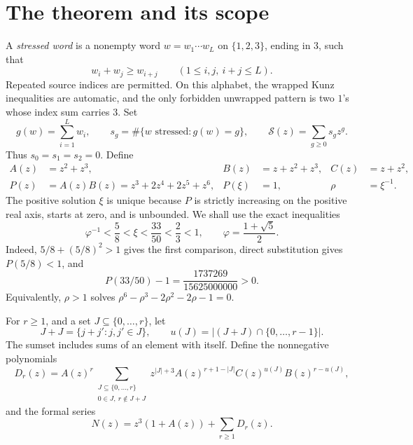 \documentclass[11pt,letterpaper]{article}
\theoremstyle{definition}
\newcommand{\cS}{\mathcal S}\newcommand{\cU}{\mathcal U}
\begin{document}
\section{The theorem and its scope}\label{ska:sec:theorem}
A \emph{stressed word} is a nonempty word $w=w_1\cdots w_L$ on $\{1,2,3\}$, ending in $3$, such that
\begin{equation}\label{ska:eq:unwrapped}
w_i+w_j\ge w_{i+j}\qquad(1\le i,j,\ i+j\le L).
\end{equation}
Repeated source indices are permitted. On this alphabet, the wrapped Kunz inequalities are automatic, and the only forbidden unwrapped pattern is two $1$'s whose index sum carries $3$. Set
\[
g(w)=\sum_{i=1}^Lw_i,\qquad
s_g=\#\{w\text{ stressed}:g(w)=g\},\qquad
\cS(z)=\sum_{g\ge0}s_gz^g.
\]
Thus $s_0=s_1=s_2=0$. Define
\begin{align}
A(z)&=z^2+z^3,& B(z)&=z+z^2+z^3,& C(z)&=z+z^2,\label{ska:eq:ABC}\\
P(z)&=A(z)B(z)=z^3+2z^4+2z^5+z^6,
&P(\xi)&=1,& \rho&=\xi^{-1}.\label{ska:eq:P}
\end{align}
The positive solution $\xi$ is unique because $P$ is strictly increasing on the positive real axis, starts at zero, and is unbounded. We shall use the exact inequalities
\begin{equation}\label{ska:eq:rootbracket}
\varphi^{-1}<\frac58<\xi<\frac{33}{50}<\frac23<1,
\qquad \varphi=\frac{1+\sqrt5}{2}.
\end{equation}
Indeed, $5/8+(5/8)^2>1$ gives the first comparison, direct substitution gives $P(5/8)<1$, and
\begin{equation}\label{ska:eq:rootcert}
P(33/50)-1=\frac{1737269}{15625000000}>0.
\end{equation}
Equivalently, $\rho>1$ solves $\rho^6-\rho^3-2\rho^2-2\rho-1=0$.

For $r\ge1$, and a set $J\subseteq\{0,\ldots,r\}$, let
\[
J+J=\{j+j':j,j'\in J\},\qquad
u(J)=|(J+J)\cap\{0,\ldots,r-1\}|.
\]
The sumset includes sums of an element with itself. Define the nonnegative polynomials
\begin{equation}\label{ska:eq:Dr}
D_r(z)=A(z)^r
\sum_{\substack{J\subseteq\{0,\ldots,r\}\\0\in J,\ r\notin J+J}}
z^{|J|+3}A(z)^{r+1-|J|}C(z)^{u(J)}B(z)^{r-u(J)},
\end{equation}
and the formal series
\begin{equation}\label{ska:eq:N}
N(z)=z^3(1+A(z))+\sum_{r\ge1}D_r(z).
\end{equation}
\end{document}
